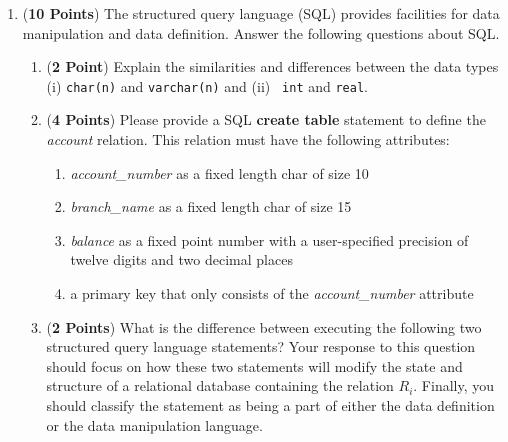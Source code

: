 \documentclass[12pt]{article}
\begin{document}
\begin{enumerate}
\begin{enumerate}

\end{enumerate}

\newpage

\item ({\bf 10 Points}) The structured query language (SQL) provides
  facilities for data manipulation and data definition.  Answer the
  following questions about SQL.

\begin{enumerate}

\item ({\bf 2 Point}) Explain the similarities and differences between
  the data types (i) {\tt char(n)} and {\tt varchar(n)} and (ii) {\tt
    int} and {\tt real}.

\item ({\bf 4 Points}) Please provide a SQL {\bf create table} statement
  to define the {\em account} relation.  This relation must have the 
  following attributes:

  \begin{enumerate}

  \item {\em account\_number} as a fixed length char of size 10
    
  \item {\em branch\_name} as a fixed length char of size 15

  \item {\em balance} as a fixed point number with a user-specified
    precision of twelve digits and two decimal places

  \item a primary key that only consists of the {\em account\_number}
    attribute

  \end{enumerate}

\item ({\bf 2 Points}) What is the difference between executing the
  following two structured query language statements?  Your response
  to this question should focus on how these two statements will
  modify the state and structure of a relational database containing
  the relation $R_i$.  Finally, you should classify the statement as
  being a part of either the data definition or the data manipulation
  language.

  \begin{enumerate}


\end{enumerate}
\end{enumerate}
\end{enumerate}
\end{document}
